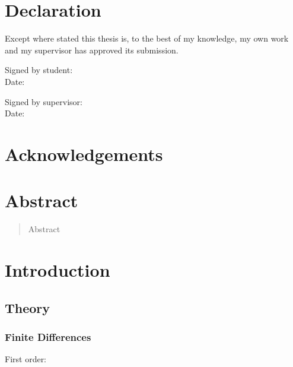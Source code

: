 \documentclass{X:/Documents/Coding/Latex/myreport}
\theoremstyle{plain}
\theoremstyle{definition}
\theoremstyle{remark}
\numberwithin{equation}{section}
\numberwithin{figure}{section}
\begin{document}
%
%

\chapter*{Declaration}

Except where stated this thesis is, to  the best of my knowledge,  my own work and my supervisor has approved its submission.

\vspace{20 pt}

\begin{flushleft}
Signed by student:  \\[15 pt]
Date:
\end{flushleft}

\vspace{20 pt}
\begin{flushleft}
Signed  by supervisor:\\[15 pt]
Date:
\end{flushleft}


\chapter*{Acknowledgements}

\chapter*{Abstract}

\begin{abstract}
	Abstract
\end{abstract}

\tableofcontents

%
%
\chapter{Introduction}


\section{Theory}
\theorem{}
\lemma

\subsection{Finite Differences}
First order:
\end{document}
